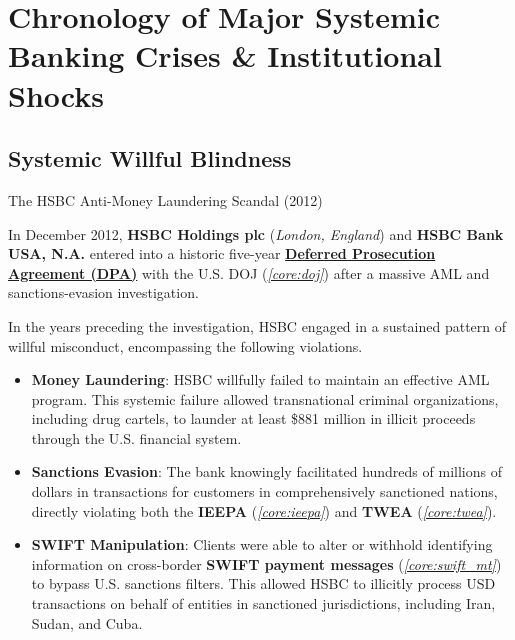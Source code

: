 \documentclass[10pt]{article}
\begin{document}
\section{Chronology of Major Systemic Banking Crises \& Institutional Shocks}

  \subsection{Systemic Willful Blindness}

    \begin{core}[label=core:hsbc_aml]{The HSBC Anti-Money Laundering Scandal (2012)}

      In December 2012, \textbf{HSBC Holdings plc} (\textit{London, England}) and \textbf{HSBC Bank USA, N.A.} entered into a historic five-year \href{https://www.sec.gov/Archives/edgar/data/83246/000119312512499980/d453978dex101.htm#:~:text=DEFERRED%20PROSECUTION%20AGREEMENT.%20Defendant%20HSBC%20Bank%20USA%2C,*%20Criminal%20Information%20and%20Acceptance%20of%20Responsibility.}{\textbf{Deferred Prosecution Agreement (DPA)}} with the U.S. DOJ (\textit{\autoref{core:doj}}) after a massive AML and sanctions-evasion investigation. 

      In the years preceding the investigation, HSBC engaged in a sustained pattern of willful misconduct, encompassing the following violations.

      \begin{itemize}

        \item \textbf{Money Laundering}: HSBC willfully failed to maintain an effective AML program. This systemic failure allowed transnational criminal organizations, including drug cartels, to launder at least \$881 million in illicit proceeds through the U.S. financial system.

        \item \textbf{Sanctions Evasion}: The bank knowingly facilitated hundreds of millions of dollars in transactions for customers in comprehensively sanctioned nations, directly violating both the \textbf{IEEPA} (\textit{\autoref{core:ieepa}}) and \textbf{TWEA} (\textit{\autoref{core:twea}}).

        \item \textbf{SWIFT Manipulation}: Clients were able to alter or withhold identifying information on cross-border \textbf{SWIFT payment messages} (\textit{\autoref{core:swift_mt}}) to bypass U.S. sanctions filters. This allowed HSBC to illicitly process USD transactions on behalf of entities in sanctioned jurisdictions, including Iran, Sudan, and Cuba.


\end{itemize}
\end{core}
\end{document}
